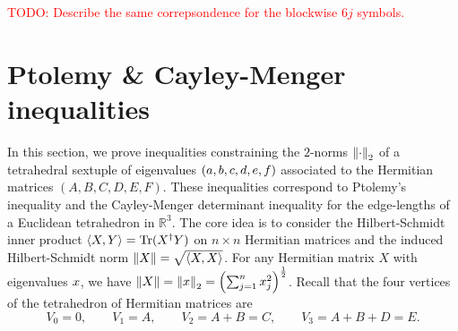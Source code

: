 \documentclass[notitlepage, 10pt]{article}
\begin{document}
\textcolor{red}{TODO: Describe the same correpsondence for the blockwise $6j$ symbols.}

\section{Ptolemy \& Cayley-Menger inequalities}

In this section, we prove inequalities constraining the $2$-norms $\left\lVert\cdot\right\rVert_{2}$ of a tetrahedral sextuple of eigenvalues $(a,b,c,d,e,f)$ associated to the Hermitian matrices $(A,B,C,D,E,F)$.
These inequalities correspond to Ptolemy's inequality and the Cayley-Menger determinant inequality for the edge-lengths of a Euclidean tetrahedron in $\mathbb R^3$. 
The core idea is to consider the Hilbert-Schmidt inner product $\braket{X,Y} = \operatorname{Tr}(X^{\dagger} Y)$ on $n\times n$ Hermitian matrices and the induced Hilbert-Schmidt norm $\left\lVert X\right\rVert = \sqrt{\braket{X,X}}$.
For any Hermitian matrix $X$ with eigenvalues $x$, we have $\left\lVert X\right\rVert = \left\lVert x\right\rVert_2 = \left(\sum_{j=1}^{n} x_j^2\right)^{\frac{1}{2}}$.
Recall that the four vertices of the tetrahedron of Hermitian matrices are
\begin{equation}
    V_0 = 0, \qquad V_1 = A, \qquad V_2 = A+B = C, \qquad V_3 = A+B+D = E.
\end{equation}
\end{document}
